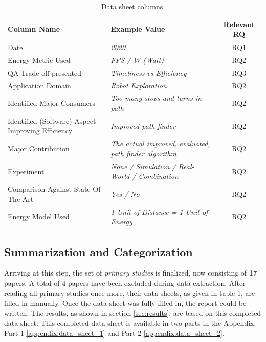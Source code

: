 \begin{table}[t]
    \centering
    \caption{Data sheet columns.}
    \begin{tabular}{llc}
        \toprule
            Column Name & 
            Example Value & 
            Relevant RQ  \\
        \midrule
            Date & 
                \textit{2020} & 
                RQ1 \\
            Energy Metric Used & 
                \textit{FPS / W (Watt)} & 
                RQ2 \\
            QA Trade-off presented & 
                \textit{Timeliness vs Efficiency} & 
                RQ3 \\
            Application Domain & 
                \textit{Robot Exploration} & 
                RQ2 \\
            Identified Major Consumers & 
                \textit{Too many stops and turns in path} & 
                RQ2 \\
            Identified (Software) Aspect Improving Efficiency & 
                \textit{Improved path finder} & 
                RQ2 \\
            Major Contribution & 
                \textit{The actual improved, evaluated, path finder algorithm} & 
                RQ2 \\
            Experiment & 
                \textit{None / Simulation / Real-World / Combination} & 
                RQ2 \\
            Comparison Against State-Of-The-Art & 
                \textit{Yes / No} & 
                RQ2 \\
            Energy Model Used &
                \textit{1 Unit of Distance = 1 Unit of Energy} & 
                RQ2 \\
        \bottomrule
    \end{tabular}
    \label{table:data_sheet}
\end{table}

\subsection{Summarization and Categorization}
\label{sec:study_design:summ_categor}
Arriving at this step, the set of \textit{primary studies} is finalized, now consisting of \textbf{17} papers. 
A total of 4 papers have been excluded during data extraction.
After reading all primary studies once more, their data sheets, as given in table \ref{table:data_sheet}, are filled in manually. 
Once the data sheet was fully filled in, the report could be written. 
The results, as shown in section \ref{sec:results}, are based on this completed data sheet.
This completed data sheet is available in two parts in the Appendix: Part 1 \ref{appendix:data_sheet_1} and Part 2 \ref{appendix:data_sheet_2}.